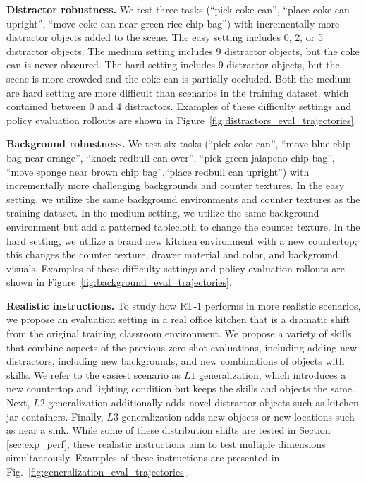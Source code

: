 \documentclass{article} %
\begin{document}
\textbf{Distractor robustness.}
We test three tasks (``pick coke can'', ``place coke can upright'', ``move coke can near green rice chip bag'') with incrementally more distractor objects added to the scene.
The easy setting includes 0, 2, or 5 distractor objects.
The medium setting includes 9 distractor objects, but the coke can is never obscured.
The hard setting includes 9 distractor objects, but the scene is more crowded and the coke can is partially occluded.
Both the medium are hard setting are more difficult than scenarios in the training dataset, which contained between 0 and 4 distractors.
Examples of these difficulty settings and policy evaluation rollouts are shown in Figure~\ref{fig:distractors_eval_trajectories}.

\textbf{Background robustness.}
We test six tasks (``pick coke can'', ``move blue chip bag near orange'', ``knock redbull can over'', ``pick green jalapeno chip bag'', ``move sponge near brown chip bag'',``place redbull can upright'') with incrementally more challenging backgrounds and counter textures.
In the easy setting, we utilize the same background environments and counter textures as the training dataset.
In the medium setting, we utilize the same background environment but add a patterned tablecloth to change the counter texture.
In the hard setting, we utilize a brand new kitchen environment with a new countertop; this changes the counter texture, drawer material and color, and background visuals.
Examples of these difficulty settings and policy evaluation rollouts are shown in Figure~\ref{fig:background_eval_trajectories}.

\textbf{Realistic instructions.}
To study how RT-1 performs in more realistic scenarios, we propose an evaluation setting in a real office kitchen that is a dramatic shift from the original training classroom environment.
We propose a variety of skills that combine aspects of the previous zero-shot evaluations, including adding new distractors, including new backgrounds, and new combinations of objects with skills.
We refer to the easiest scenario as $L1$ generalization, which introduces a new countertop and lighting condition but keeps the skills and objects the same.
Next, $L2$ generalization additionally adds novel distractor objects such as kitchen jar containers.
Finally, $L3$ generalization adds new objects or new locations such as near a sink.
While some of these distribution shifts are tested in Section \ref{sec:exp_perf}, these realistic instructions aim to test multiple dimensions simultaneously.
Examples of these instructions are presented in Fig.~\ref{fig:generalization_eval_trajectories}.
\end{document}
